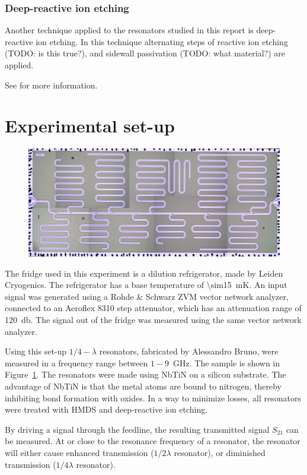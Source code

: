 \documentclass[12pt]{report}
\begin{document}
\subsubsection{Deep-reactive ion etching}

Another technique applied to the resonators studied in this report is deep-reactive ion etching. In this technique alternating steps of reactive ion etching (TODO: is this true?), and sidewall passivation (TODO: what material?) are applied.


See \cite{DRIE} for more information.


\section{Experimental set-up}


\begin{figure}[h]
    \centering
    \includegraphics[width = .4\textwidth]{Figures/All_set4.png}
    \label{fig:set4}
\end{figure}

The fridge used in this experiment is a dilution refrigerator, made by Leiden Cryogenics. The refrigerator has a base temperature of \SI{\sim15}{\milli \kelvin}. An input signal was generated using a Rohde \& Schwarz ZVM vector network analyzer, connected to an Aeroflex 8310 step attenuator, which has an attenuation range of \SI{120}{\decibel}. The signal out of the fridge was measured using the same vector network analyzer.

Using this set-up $1/4 - \lambda$ resonators, fabricated by Alessandro Bruno, were measured in a frequency range between $1-9$\SI{}{\giga \hertz}. The sample is shown in Figure~\ref{fig:set4}. The resonators were made using NbTiN on a silicon substrate. The advantage of NbTiN is that the metal atoms are bound to nitrogen, thereby inhibiting bond formation with oxides. In a way to minimize losses, all resonators were treated with HMDS and deep-reactive ion etching.

By driving a signal through the feedline, the resulting transmitted signal $S_{21}$ can be measured. At or close to the resonance frequency of a resonator, the resonator will either cause enhanced transmission ($1/2 \lambda$ resonator), or diminished transmission ($1/4 \lambda$ resonator).
\end{document}
